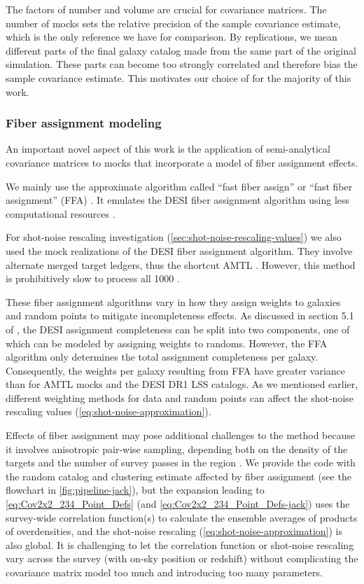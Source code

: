 The factors of number and volume are crucial for covariance matrices.
The number of mocks sets the relative precision of the sample covariance estimate, which is the only reference we have for comparison.
By replications, we mean different parts of the final galaxy catalog made from the same part of the original simulation.
These parts can become too strongly correlated and therefore bias the sample covariance estimate.
This motivates our choice of \ezmocks{} for the majority of this work.

\subsubsection{Fiber assignment modeling}
\label{sec:fiber-assignment-models}

An important novel aspect of this work is the application of semi-analytical covariance matrices to mocks that incorporate a model of fiber assignment effects.

We mainly use the approximate algorithm called ``fast fiber assign'' or ``fast fiber assignment'' (FFA) \citep{KP3s11-Sikandar,KP3s6-Bianchi}.
It emulates the DESI fiber assignment algorithm using less computational resources \citep{DESI2024.III.KP4}.

For shot-noise rescaling investigation (\cref{sec:shot-noise-rescaling-values}) we also used the mock realizations of the DESI fiber assignment algorithm.
They involve alternate merged target ledgers, thus the shortcut AMTL \citep{KP3s7-Lasker}.
However, this method is prohibitively slow to process all 1000 \ezmocks{} \citep{DESI2024.III.KP4}.

These fiber assignment algorithms vary in how they assign weights to galaxies and random points to mitigate incompleteness effects.
As discussed in section 5.1 of \cite{KP3s15-Ross}, the DESI assignment completeness can be split into two components, one of which can be modeled by assigning weights to randoms.
However, the FFA algorithm only determines the total assignment completeness per galaxy.
Consequently, the weights per galaxy resulting from FFA have greater variance than for AMTL mocks and the DESI DR1 LSS catalogs.
As we mentioned earlier, different weighting methods for data and random points can affect the shot-noise rescaling values (\cref{eq:shot-noise-approximation}).

Effects of fiber assignment may pose additional challenges to the method because it involves anisotropic pair-wise sampling, depending both on the density of the targets and the number of survey passes in the region \citep{KP3s6-Bianchi}.
We provide the \rascalc{} code with the random catalog and clustering estimate affected by fiber assignment (see the flowchart in \cref{fig:pipeline-jack}), but the expansion leading to \cref{eq:Cov2x2_234_Point_Defs} (and \cref{eq:Cov2x2_234_Point_Defs-jack}) uses the survey-wide correlation function(s) to calculate the ensemble averages of products of overdensities, and the shot-noise rescaling (\cref{eq:shot-noise-approximation}) is also global.
It is challenging to let the correlation function or shot-noise rescaling vary across the survey (with on-sky position or redshift) without complicating the covariance matrix model too much and introducing too many parameters.

